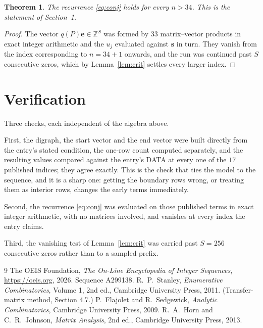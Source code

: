 \documentclass[11pt,a4paper]{article}
\theoremstyle{plain}
\newtheorem{theorem}{Theorem}
\theoremstyle{definition}
\begin{document}
\begin{theorem}
The recurrence \eqref{eq:conj} holds for every $n>34$. This is the statement of
Section~1.
\end{theorem}

\begin{proof}
The vector $q(P)\mathbf{e}\in\mathbb{Z}^{S}$ was formed by $33$ matrix--vector
products in exact integer arithmetic and the $u_j$ evaluated against $\mathbf{s}$ in turn.
They vanish from the index corresponding to $n=34+1$ onwards, and the run was continued
past $S$ consecutive zeros, which by Lemma~\ref{lem:crit} settles every larger index.
\end{proof}

\section{Verification}

Three checks, each independent of the algebra above.

First, the digraph, the start vector and the end vector were built directly from the
entry's stated condition, the one-row count computed separately, and the resulting values
compared against the entry's DATA at every one of the $17$ published indices; they
agree exactly. This is the check that ties the model to the sequence, and it is a sharp one:
getting the boundary rows wrong, or treating them as interior rows, changes the early terms
immediately.

Second, the recurrence \eqref{eq:conj} was evaluated on those published terms in exact
integer arithmetic, with no matrices involved, and vanishes at every index the entry claims.

Third, the vanishing test of Lemma~\ref{lem:crit} was carried past $S=256$ consecutive
zeros rather than to a sampled prefix.

\begin{thebibliography}{9}
 The OEIS Foundation, \emph{The On-Line Encyclopedia of Integer
Sequences}, \url{https://oeis.org}, 2026. Sequence A299138.
 R.~P.~Stanley, \emph{Enumerative Combinatorics}, Volume 1, 2nd ed.,
Cambridge University Press, 2011. (Transfer-matrix method, Section 4.7.)
 P.~Flajolet and R.~Sedgewick, \emph{Analytic Combinatorics}, Cambridge
University Press, 2009.
 R.~A.~Horn and C.~R.~Johnson, \emph{Matrix Analysis}, 2nd ed., Cambridge
University Press, 2013.
\end{thebibliography}
\end{document}
